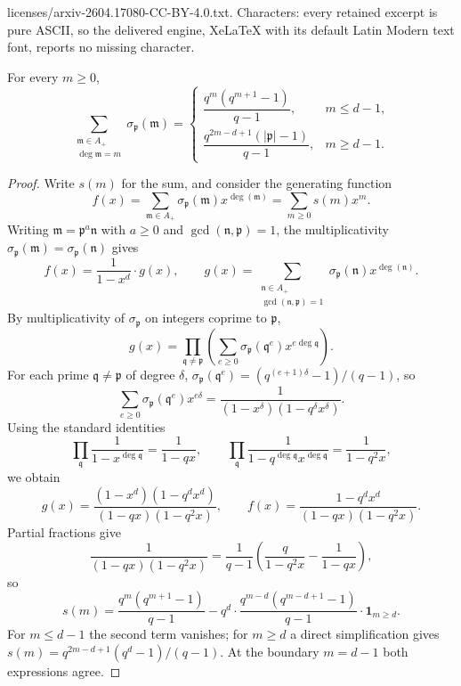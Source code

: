 \documentclass[10pt,a4paper]{amsart}
\newcommand{\abs}[1]{\left|#1\right|}
\newcommand{\fm}{\mathfrak{m}}
\newcommand{\fn}{\mathfrak{n}}
\newcommand{\fp}{\mathfrak{p}}
\newcommand{\fq}{\mathfrak{q}}
\begin{document}
licenses/arxiv-2604.17080-CC-BY-4.0.txt. Characters: every retained excerpt is pure ASCII, so the delivered engine, XeLaTeX with its default Latin Modern text font, reports no missing character.
	\begin{lem}\label{lem_sigmap}
		For every $m\geq 0$,
		\[
		\sum_{\substack{\fm\in A_+\\ \deg\fm = m}}\sigma_\fp(\fm) = \begin{cases}
			\dfrac{q^m(q^{m+1}-1)}{q-1}, & m\leq d-1, \\[1ex]
			\dfrac{q^{2m-d+1}(\abs{\fp}-1)}{q-1}, & m\geq d-1.
		\end{cases}
		\]
	\end{lem}

	\begin{proof}
		Write $s(m)$ for the sum, and consider the generating function
		\[
		f(x) = \sum_{\fm\in A_+}\sigma_\fp(\fm) x^{\deg(\fm)} = \sum_{m\geq 0} s(m) x^m.
		\]
		Writing $\fm = \fp^a\fn$ with $a\geq 0$ and $\gcd(\fn,\fp) = 1$, the multiplicativity $\sigma_\fp(\fm) = \sigma_\fp(\fn)$ gives
		\[
		f(x) = \frac{1}{1-x^d}\cdot g(x), \qquad g(x) = \sum_{\substack{\fn\in A_+\\ \gcd(\fn,\fp)=1}} \sigma_\fp(\fn) x^{\deg(\fn)}.
		\]
		By multiplicativity of $\sigma_\fp$ on integers coprime to $\fp$,
		\[
		g(x) = \prod_{\fq\neq \fp}\left(\sum_{e\geq 0}\sigma_\fp(\fq^e) x^{e\deg\fq}\right).
		\]
		For each prime $\fq\neq \fp$ of degree $\delta$, $\sigma_\fp(\fq^e) = (q^{(e+1)\delta}-1)/(q-1)$, so
		\[
		\sum_{e\geq 0}\sigma_\fp(\fq^e) x^{e\delta} = \frac{1}{(1-x^\delta)(1-q^\delta x^\delta)}.
		\]
		Using the standard identities
		\[
		\prod_\fq \frac{1}{1-x^{\deg\fq}} = \frac{1}{1-qx}, \qquad \prod_\fq \frac{1}{1-q^{\deg\fq} x^{\deg\fq}} = \frac{1}{1-q^2 x},
		\]
		we obtain
		\[
		g(x) = \frac{(1-x^d)(1-q^d x^d)}{(1-qx)(1-q^2 x)}, \qquad f(x) = \frac{1-q^d x^d}{(1-qx)(1-q^2 x)}.
		\]
		Partial fractions give
		\[
		\frac{1}{(1-qx)(1-q^2 x)} = \frac{1}{q-1}\left(\frac{q}{1-q^2 x} - \frac{1}{1-qx}\right),
		\]
		so %
		\[
		s(m) %
		= \frac{q^m(q^{m+1}-1)}{q-1} - q^d \cdot \frac{q^{m-d}(q^{m-d+1}-1)}{q-1}\cdot \mathbf{1}_{m\geq d}.
		\]
		For $m\leq d-1$ the second term vanishes; for $m\geq d$ a direct simplification gives $s(m) = q^{2m-d+1}(q^d-1)/(q-1)$. At the boundary $m=d-1$ both expressions agree.
	\end{proof}
\end{document}
